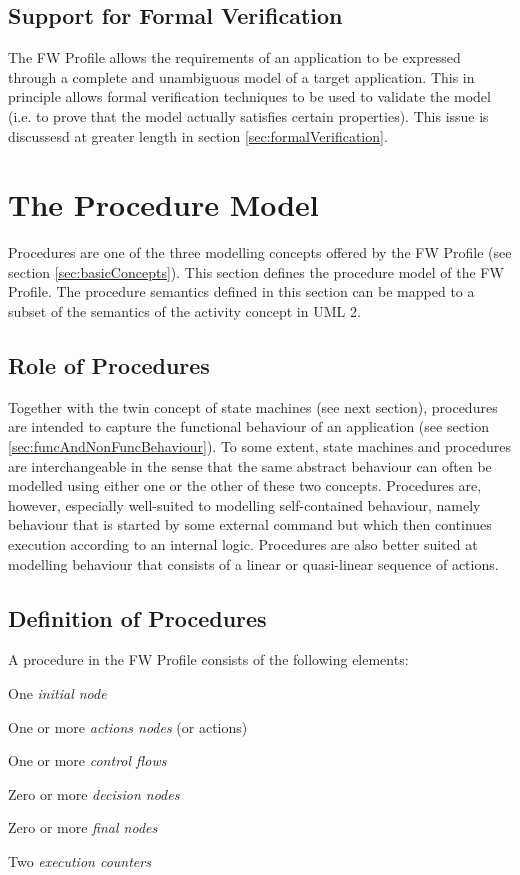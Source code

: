 \documentclass[a4paper,10pt]{article}
\let\stdsection\section
\renewcommand\section{\newpage\stdsection}
\newenvironment{fw_itemize}						%
{\begin{itemize}
  \setlength{\itemsep}{1mm}
  \setlength{\parskip}{0pt}
  \setlength{\parsep}{0pt}}
{\end{itemize}}
\begin{document}
\subsection{Support for Formal Verification}
The FW Profile allows the requirements of an application to be expressed through a complete and unambiguous model of a target application. This in principle allows formal verification techniques to be used to validate the model (i.e. to prove that the model actually satisfies certain properties). This issue is discussesd at greater length in section \ref{sec:formalVerification}.


\section{The Procedure Model}
Procedures are one of the three modelling concepts offered by the FW Profile (see section \ref{sec:basicConcepts}).
This section defines the procedure model of the FW Profile. The procedure semantics defined
in this section can be mapped to a subset of the semantics of the activity concept in UML 2.

\subsection{Role of Procedures}
Together with the twin concept of state machines (see next section), procedures are intended to
capture the functional behaviour of an application (see section \ref{sec:funcAndNonFuncBehaviour}). To some extent, state
machines and procedures are interchangeable in the sense that the same abstract behaviour can
often be modelled using either one or the other of these two concepts.
Procedures are, however, especially well-suited to modelling self-contained behaviour, namely
behaviour that is started by some external command but which then continues execution
according to an internal logic. Procedures are also better suited at modelling behaviour that
consists of a linear or quasi-linear sequence of actions.

\subsection{Definition of Procedures}
A procedure in the FW Profile consists of the following elements:

\begin{fw_itemize} 
\item One \emph{initial node}
\item One or more \emph{actions nodes} (or actions)
\item One or more \emph{control flows}
\item Zero or more \emph{decision nodes}
\item Zero or more \emph{final nodes}
\item Two \emph{execution counters}
\end{fw_itemize}
\end{document}
